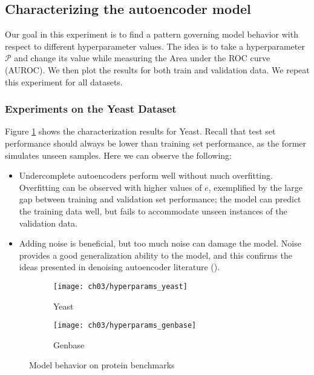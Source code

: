 \subsection{Characterizing the autoencoder model}

Our goal in this experiment is to find a pattern governing model behavior
with respect to different hyperparameter values. The idea is to take a
hyperparameter $\mathcal{P}$ and change its value while measuring the Area
under the ROC curve (AUROC). We then plot the results for both train and
validation data. We repeat this experiment for all datasets.

\subsubsection{Experiments on the Yeast Dataset}

Figure \ref{results:sdae_char_yeast} shows the characterization results for
Yeast. Recall that test set performance should always be lower than training
set performance, as the former simulates unseen samples. Here we can observe
the following:

\begin{itemize}
  \item Undercomplete autoencoders perform well without much overfitting.
  Overfitting can be observed with higher values of $e$, exemplified by the
  large gap between training and validation set performance; the model can
  predict the training data well, but fails to accommodate unseen instances
  of the validation data.
  \item Adding noise is beneficial, but too much noise can damage the model.
  Noise provides a good generalization ability to the model, and this
  confirms the ideas presented in denoising autoencoder literature (\cite{vincent2008denoising, vincent2010stacked}).
\end{itemize}
 
\begin{figure}[!t]
  \centering
  \begin{subfigure}[b]{0.48\textwidth}
    \texttt{[image: ch03/hyperparams\_yeast]}
    \caption{Yeast}
    \label{results:sdae_char_yeast}
  \end{subfigure}
  \begin{subfigure}[b]{0.48\textwidth}
    \texttt{[image: ch03/hyperparams\_genbase]}
    \caption{Genbase}
    \label{results:sdae_char_genbase}
  \end{subfigure}
  \caption{Model behavior on protein benchmarks}
  \label{results:sdae_char}
\end{figure}


